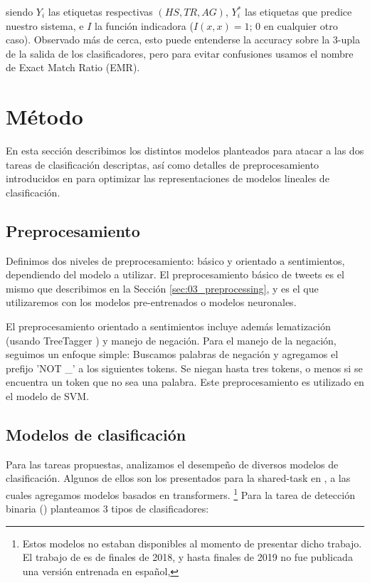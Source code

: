 \noindent siendo $Y_i$ las etiquetas respectivas $(HS, TR, AG)$, $Y_i^*$ las etiquetas que predice nuestro sistema, e  $I$ la función indicadora ($I(x, x) = 1$; $0$ en cualquier otro caso). Observado más de cerca, esto puede entenderse la accuracy sobre la 3-upla de la salida de los clasificadores, pero para evitar confusiones usamos el nombre de Exact Match Ratio (EMR). \cite{zhang-2014-multilabel}

\section{Método}

En esta sección describimos los distintos modelos planteados para atacar a las dos tareas de clasificación descriptas, así como detalles de preprocesamiento introducidos en \citet{perez-2019-atalaya} para optimizar las representaciones de modelos lineales de clasificación.

\subsection{Preprocesamiento}
\label{sec:04_preprocessing}

Definimos dos niveles de preprocesamiento: básico y orientado a sentimientos, dependiendo del modelo a utilizar. El preprocesamiento básico de tweets es el mismo que describimos en la Sección \ref{sec:03_preprocessing}, y es el que utilizaremos con los modelos pre-entrenados o modelos neuronales.

El preprocesamiento orientado a sentimientos incluye además lematización (usando TreeTagger \cite{schmid95}) y manejo de negación. Para el manejo de la negación, seguimos un enfoque simple:
Buscamos palabras de negación y agregamos el prefijo 'NOT \_' a los siguientes tokens. Se niegan hasta tres tokens, o menos si se encuentra un token que no sea una palabra. Este preprocesamiento es utilizado en el modelo de SVM.

\subsection{Modelos de clasificación}
\label{sec:04_classifiers}

Para las tareas propuestas, analizamos el desempeño de diversos modelos de clasificación. Algunos de ellos son los presentados para la shared-task \hateval{} en \citet{perez-2019-atalaya}, a las cuales agregamos modelos basados en transformers. \footnote{Estos modelos no estaban disponibles al momento de presentar dicho trabajo. El trabajo de \bert{} \cite{devlin2018bert} es de finales de 2018, y hasta finales de 2019 no fue publicada una versión entrenada en español, \beto{}} Para la tarea de detección binaria (\subtaska{}) planteamos 3 tipos de clasificadores:

